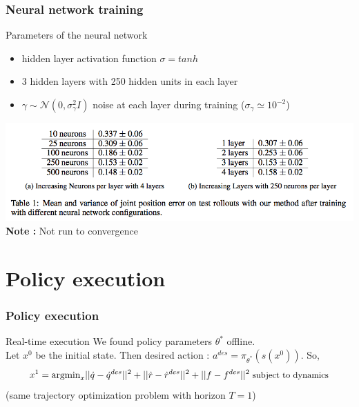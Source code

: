 \documentclass[mathserif]{beamer}
\begin{document}

\begin{frame}
  \frametitle{{Neural network training}}
  \begin{block}{Parameters of the neural network}
\begin{itemize}
\item hidden layer activation function $\sigma = tanh$
\item 3 hidden layers with 250 hidden units in each layer
\item $\gamma \sim \mathcal{N}(0,\sigma_{\gamma}^{2}I)$ noise at each layer during training ($\sigma_{\gamma} \simeq 10^{-2}$)
\end{itemize}
  \end{block}
  \includegraphics[scale=0.4]{nn}\\
  
\textbf{Note :} Not run to convergence
\end{frame}




\section{Policy execution}

\begin{frame}
  \frametitle{{Policy execution}}
  \begin{block}{Real-time execution}
  We found policy parameters $\theta^{*}$ offline. \\
  Let $x^0$ be the initial state. Then desired action : $a^{des} = \pi_{\theta^{*}}(s(x^0))$.
  So, 
  \[
  x^{1} = \text{argmin}_{x} ||\dot{q} - \dot{q}^{des}||^2 + ||\dot{r} - \dot{r}^{des}||^2 + ||f - f^{des}||^2 \hspace{3pt} \text{\small subject to dynamics}
  \]
  (same trajectory optimization problem with horizon $T=1$)
  \end{block}
 
\end{frame}
\end{document}
